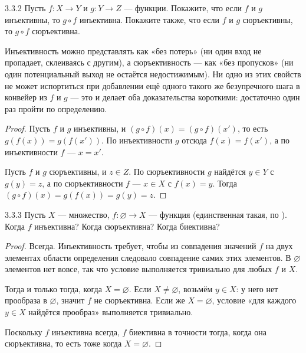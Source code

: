 \begin{exercise}{3.3.2}{}
Пусть $f:X\to Y$ и $g:Y\to Z$ — функции. Покажите, что если $f$ и $g$ инъективны, то
$g\circ f$ инъективна. Покажите также, что если $f$ и $g$ сюръективны, то $g\circ f$
сюръективна.
\end{exercise}

\begin{intuition}
Инъективность можно представлять как «без потерь» (ни один вход не пропадает, склеиваясь
с другим), а сюръективность — как «без пропусков» (ни один потенциальный выход не остаётся
недостижимым). Ни одно из этих свойств не может испортиться при добавлении ещё одного
такого же безупречного шага в конвейер из $f$ и $g$ — это и делает оба доказательства
короткими: достаточно один раз пройти по определению.
\end{intuition}

\begin{proof}
 Пусть $f$ и $g$ инъективны, и $(g\circ f)(x)=(g\circ f)(x')$, то
есть $g(f(x))=g(f(x'))$. По инъективности $g$ отсюда $f(x)=f(x')$, а по инъективности $f$ —
$x=x'$.

 Пусть $f$ и $g$ сюръективны, и $z\in Z$. По сюръективности $g$
найдётся $y\in Y$ с $g(y)=z$, а по сюръективности $f$ — $x\in X$ с $f(x)=y$. Тогда
$(g\circ f)(x)=g(f(x))=g(y)=z$.
\end{proof}

\begin{exercise}{3.3.3}{}
Пусть $X$ — множество, $f:\varnothing\to X$ — функция (единственная такая, по
). Когда $f$ инъективна? Когда сюръективна? Когда
биективна?
\end{exercise}

\begin{proof}
 Всегда. Инъективность требует, чтобы из совпадения значений $f$
на двух элементах области определения следовало совпадение самих этих элементов. В
$\varnothing$ элементов нет вовсе, так что условие выполняется тривиально для любых $f$ и $X$.

 Тогда и только тогда, когда $X=\varnothing$. Если
$X\neq\varnothing$, возьмём $y\in X$: у него нет прообраза в $\varnothing$, значит $f$ не
сюръективна. Если же $X=\varnothing$, условие «для каждого $y\in X$ найдётся прообраз»
выполняется тривиально.

 Поскольку $f$ инъективна всегда, $f$ биективна в точности тогда,
когда она сюръективна, то есть тоже когда $X=\varnothing$.
\end{proof}

